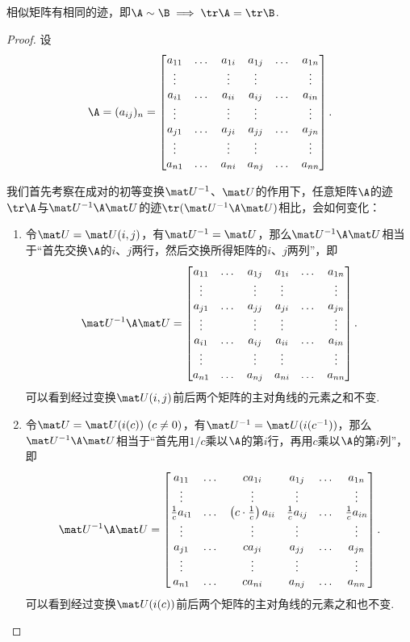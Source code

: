 \begin{property}\label{theorem:特征值与特征向量.矩阵相似的必要条件4}
相似矩阵有相同的迹，即\(\A\sim\B \implies \tr\A=\tr\B\).
\begin{proof}
设\[
\A = (a_{ij})_n
= \begin{bmatrix}
a_{11} & \dots & a_{1i} & a_{1j}  & \dots & a_{1n} \\
\vdots & & \vdots & \vdots & & \vdots \\
a_{i1} & \dots & a_{ii} & a_{ij}  & \dots & a_{in} \\
\vdots & & \vdots & \vdots  & & \vdots \\
a_{j1} & \dots & a_{ji} & a_{jj}  & \dots & a_{jn} \\
\vdots & & \vdots & \vdots  & & \vdots \\
a_{n1} & \dots & a_{ni} & a_{nj}  & \dots & a_{nn}
\end{bmatrix}.
\]

我们首先考察在成对的初等变换\(\P^{-1}\)、\(\P\)的作用下，任意矩阵\(\A\)的迹\(\tr\A\)与\(\P^{-1} \A \P\)的迹\(\tr(\P^{-1} \A \P)\)相比，会如何变化：
\begin{enumerate}
\item 令\(\P = \P(i,j)\)，有\(\P^{-1} = \P\)，那么\(\P^{-1} \A \P\)相当于“首先交换\(\A\)的\(i\)、\(j\)两行，然后交换所得矩阵的\(i\)、\(j\)两列”，即\[
\P^{-1} \A \P
= \begin{bmatrix}
a_{11} & \dots & a_{1j} & a_{1i}  & \dots & a_{1n} \\
\vdots & & \vdots & \vdots & & \vdots \\
a_{j1} & \dots & a_{jj} & a_{ji}  & \dots & a_{jn} \\
\vdots & & \vdots & \vdots  & & \vdots \\
a_{i1} & \dots & a_{ij} & a_{ii}  & \dots & a_{in} \\
\vdots & & \vdots & \vdots  & & \vdots \\
a_{n1} & \dots & a_{nj} & a_{ni}  & \dots & a_{nn}
\end{bmatrix}.
\]可以看到经过变换\(\P(i,j)\)前后两个矩阵的主对角线的元素之和不变.

\item 令\(\P = \P(i(c))\ (c\neq0)\)，有\(\P^{-1} = \P(i(c^{-1}))\)，那么\(\P^{-1} \A \P\)相当于“首先用\(1/c\)乘以\(\A\)的第\(i\)行，再用\(c\)乘以\(\A\)的第\(i\)列”，即\[
\P^{-1} \A \P
= \begin{bmatrix}
a_{11} & \dots & c a_{1i} & a_{1j}  & \dots & a_{1n} \\
\vdots & & \vdots & \vdots & & \vdots \\
\frac{1}{c} a_{i1} & \dots & \left( c \cdot \frac{1}{c} \right) a_{ii} & \frac{1}{c} a_{ij}  & \dots & \frac{1}{c} a_{in} \\
\vdots & & \vdots & \vdots  & & \vdots \\
a_{j1} & \dots & c a_{ji} & a_{jj}  & \dots & a_{jn} \\
\vdots & & \vdots & \vdots  & & \vdots \\
a_{n1} & \dots & c a_{ni} & a_{nj}  & \dots & a_{nn}
\end{bmatrix}.
\]可以看到经过变换\(\P(i(c))\)前后两个矩阵的主对角线的元素之和也不变.


\end{enumerate}
\end{proof}
\end{property}
